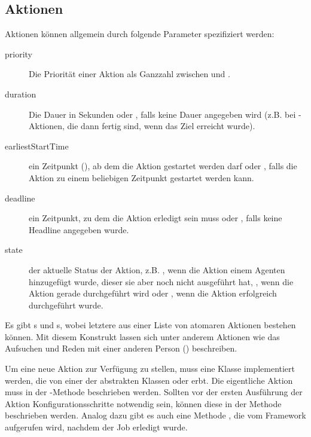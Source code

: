 \subsection{Aktionen}\label{subsec:concept_actions}
Aktionen können allgemein durch folgende Parameter spezifiziert werden:
\begin{description}
	\item[priority] Die Priorität einer Aktion als Ganzzahl zwischen  und .
	\item[duration] Die Dauer in Sekunden oder , falls keine Dauer angegeben wird (z.B. bei -Aktionen, die dann fertig sind, wenn das Ziel erreicht wurde).
	\item[earliestStartTime] ein Zeitpunkt (), ab dem die Aktion gestartet werden darf oder , falls die Aktion zu einem beliebigen Zeitpunkt gestartet werden kann.
	\item[deadline] ein Zeitpunkt, zu dem die Aktion erledigt sein muss oder , falls keine Headline angegeben wurde.
	\item[state] der aktuelle Status der Aktion, z.B. , wenn die Aktion einem Agenten hinzugefügt wurde, dieser sie aber noch nicht ausgeführt hat, , wenn die Aktion gerade durchgeführt wird oder , wenn die Aktion erfolgreich durchgeführt wurde.
\end{description}
Es gibt s und s, wobei letztere aus einer Liste von atomaren Aktionen bestehen können. Mit diesem Konstrukt lassen sich unter anderem Aktionen wie das Aufsuchen und Reden mit einer anderen Person () beschreiben.

Um eine neue Aktion zur Verfügung zu stellen, muss eine Klasse implementiert werden, die von einer der abstrakten Klassen  oder  erbt. Die eigentliche Aktion muss in der -Methode beschrieben werden. Sollten vor der ersten Ausführung der Aktion Konfigurationsschritte notwendig sein, können diese in der Methode  beschrieben werden. Analog dazu gibt es auch eine Methode , die vom Framework aufgerufen wird, nachdem der Job erledigt wurde.

